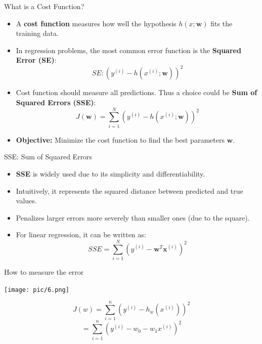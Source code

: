 \documentclass[serif, aspectratio=169]{beamer}
\begin{document}
\begin{frame}{What is a Cost Function?}
    \begin{itemize}
        \item A \textbf{cost function} measures how well the hypothesis \( h(x; \mathbf{w}) \) fits the training data.
        \item In regression problems, the most common error function is the \textbf{Squared Error (SE)}:
            \[
            SE: \left( y^{(i)} - h(x^{(i)}; \mathbf{w}) \right)^2
            \]
        \item Cost function should measure all predictions. Thus a choice could be \textbf{Sum of Squared Errors (SSE)}:
        \[
        J(\mathbf{w}) = \sum_{i=1}^{N} \left( y^{(i)} - h(x^{(i)}; \mathbf{w}) \right)^2
        \]
        \item \textbf{Objective:} Minimize the cost function to find the best parameters \( \mathbf{w} \).

    \end{itemize}

\end{frame}

\begin{frame}{SSE: Sum of Squared Errors}
    \begin{itemize}
        \item \textbf{SSE} is widely used due to its simplicity and differentiability.
        \item Intuitively, it represents the squared distance between predicted and true values.
        \item Penalizes larger errors more severely than smaller ones (due to the square).
        \item For linear regression, it can be written as:
        \[
        SSE = \sum_{i=1}^{N} \left( y^{(i)} - \mathbf{w}^T \mathbf{x}^{(i)} \right)^2
        \]
    \end{itemize}
\end{frame}





\begin{frame}{How to measure the error}

    \begin{minipage}{0.5\textwidth}
        \centering
        \texttt{[image: pic/6.png]}
    \end{minipage}%
    \begin{minipage}{0.5\textwidth}

        \[
        J(w) = \sum_{i=1}^{n} \left( y^{(i)} - h_w(x^{(i)}) \right)^2
        \]
        \[
        = \sum_{i=1}^{n} \left( y^{(i)} - w_0 - w_1 x^{(i)} \right)^2
        \]
    \end{minipage}
    \vfill
\end{frame}
\end{document}
